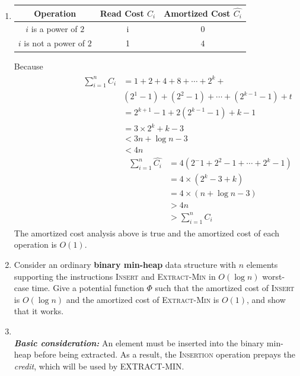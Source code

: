 \documentclass[12pt,a4paper]{article}
\makeatletter
\newtheorem*{solution}{Solution}
\theoremstyle{definition}
\renewenvironment{solution}[1][Solution] {\par\pushQED{\qed}\normalfont\topsep6\p@\@plus6\p@\relax\trivlist\item[\hskip\labelsep\bfseries#1\@addpunct{.}]\ignorespaces}{\popQED\endtrivlist\@endpefalse} \makeatother
\makeatother
\begin{document}
\begin{enumerate}
\begin{solution}
	\begin{table}[htbp]
	    \centering
	    \begin{tabular}{c|c|c}
	           \hline
	          Operation & Read Cost $C_i$ & Amortized Cost $\hat{C_i}$ \\
	         \hline
	         $i$ is a power of $2$ & i & $0$ \\
	          $i$ is not a power of $2$ &1 & $4$ \\
	       \hline
	    \end{tabular}
	\end{table}
    Because 
    \begin{align}
        \begin{split}
            \sum_{i=1}^n C_i &=1+2+4+8+\cdots +2^k+\\ &(2^1-1)+(2^2-1)+\cdots + (2^{k-1}-1)+t\\
            &=2^{k+1}-1+2(2^{k-1}-1)+k-1\\
            & =3\times 2^k+k-3\\
            &< 3n+\log n -3\\
            &< 4n
        \end{split}
        \begin{split}
            \sum_{i=1}^n \hat{C_i}
            &=4(2^-1+2^2-1+\cdots +2^k-1)\\
            &=4\times (2^k-3+k)\\
            &=4\times (n+\log n -3)\\
            &>4n\\
            &>\sum_{i=1}^n C_i
        \end{split}
    \end{align}
    The amortized cost analysis above is true and the amortized cost of each operation is $O(1)$.
    \end{solution}
	\item Consider an ordinary \textbf{binary min-heap} data structure with $n$ elements supporting
the instructions \textsc{Insert} and \textsc{Extract-Min} in $O(\log n)$ worst-case time. Give a
potential function $\Phi$ such that the amortized cost of \textsc{Insert} is $O(\log n)$ and the
amortized cost of \textsc{Extract-Min} is $O(1)$, and show that it works.
	\begin{solution}
	~\\
	\textbf{\textit{Basic consideration:}} An element must be inserted into the binary min-heap before being extracted. As a result, the \textsc{Insertion} operation prepays the \textit{credit}, which will be used by \textsc{EXTRACT-MIN}.

\end{solution}
\end{enumerate}
\end{document}

